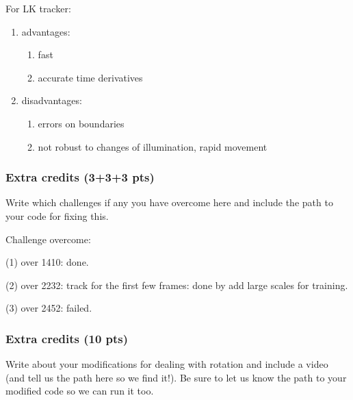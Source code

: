 \documentclass[12pt]{article}
\begin{document}
For LK tracker:
\begin{enumerate}[I]
\item advantages:
	\begin{enumerate}[(1)]
	\item fast
	\item accurate time derivatives
	\end{enumerate}
\item disadvantages:
	\begin{enumerate}[(1)]
	\item errors on boundaries
	\item not robust to changes of illumination, rapid movement
	\end{enumerate}
\end{enumerate}

\subsubsection{Extra credits (3+3+3 pts)}

Write which challenges if any you have overcome here and include the path to your code for fixing this.

Challenge overcome:

(1) over 1410: done.

(2) over 2232: track for the first few frames: done by add large scales for training. 

(3) over 2452: failed.

\subsubsection{Extra credits (10 pts)}

Write about your modifications for dealing with rotation and include a video (and tell us the path here so we find
it!). Be sure to let us know the path to your modified code so we can run it too.
\end{document}

